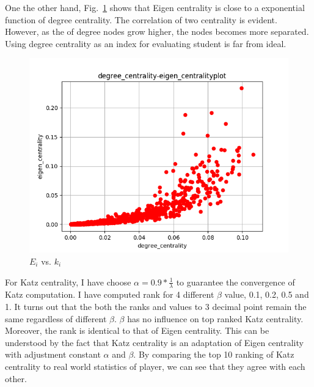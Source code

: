 \documentclass[runningheads]{llncs}
\begin{document}
One the other hand, Fig.~\ref{fig_3a_plot_eigen}  shows that Eigen centrality is close to a exponential function of degree centrality. The correlation of two centrality is evident. However, as the of degree nodes grow higher, the nodes becomes more separated. Using degree centrality as an index for evaluating student is far from ideal. 

\begin{figure}
\centering
\includegraphics[width=\textwidth]{3a_degree_eigen_plot}
\caption{ \(E_{i}\) vs. \(k_{i}\)} 
\label {fig_3a_plot_eigen}
\end{figure}


For Katz centrality, I have choose \(\alpha = 0.9*\frac{1}{\lambda} \) to guarantee the convergence of Katz computation. I have computed rank for 4 different \(\beta\) value, 0.1, 0.2, 0.5 and 1. It turns out that the both the ranks and values to 3 decimal point remain the same regardless of different \(\beta\). \(\beta\) has no influence on top ranked Katz centrality. Moreover, the rank is identical to that of Eigen centrality. This can be understood by the fact that Katz centrality is an adaptation of Eigen centrality with adjustment constant \(\alpha \) and \(\beta\). By comparing the top 10 ranking of Katz centrality to real world statistics of player, we can see that they agree with each other.
\end{document}
